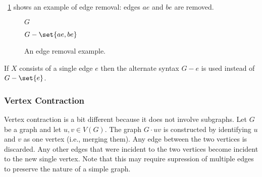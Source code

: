 \figurename~\ref{fig:eremove} shows an example of edge removal: edges \(ae\) and \(be\) are removed.

\begin{figure}[H]
  \begin{minipage}{2.75in}
    \centering

    \(G\)
  \end{minipage}
  \begin{minipage}{2.75in}
    \centering

    \(G-\set{ae,be}\)
  \end{minipage}
  \caption{An edge removal example.}
  \label{fig:eremove}
\end{figure}

If \(X\) consists of a single edge \(e\) then the alternate syntax \(G-e\) is used instead of \(G-\set{e}\).

\subsubsection{Vertex Contraction}\label{sec:sub:sub:contract}

Vertex contraction is a bit different because it does not involve subgraphs.  Let \(G\) be a graph and let \(u,v\in
V(G)\).  The graph \(G\cdot uv\) is constructed by identifying \(u\) and \(v\) as one vertex (i.e., merging them).
Any edge between the two vertices is discarded.  Any other edges that were incident to the two vertices become
incident to the new single vertex.  Note that this may require supression of multiple edges to preserve the nature
of a simple graph.

